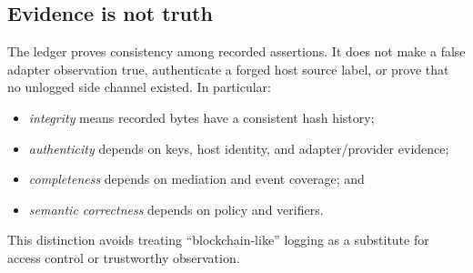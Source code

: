 \subsection{Evidence is not truth}

The ledger proves consistency among recorded assertions. It does not make a false adapter observation true, authenticate a forged host source label, or prove that no unlogged side channel existed. In particular:

\begin{itemize}
  \item \emph{integrity} means recorded bytes have a consistent hash history;
  \item \emph{authenticity} depends on keys, host identity, and adapter/provider evidence;
  \item \emph{completeness} depends on mediation and event coverage; and
  \item \emph{semantic correctness} depends on policy and verifiers.
\end{itemize}

This distinction avoids treating ``blockchain-like'' logging as a substitute for access control or trustworthy observation.
